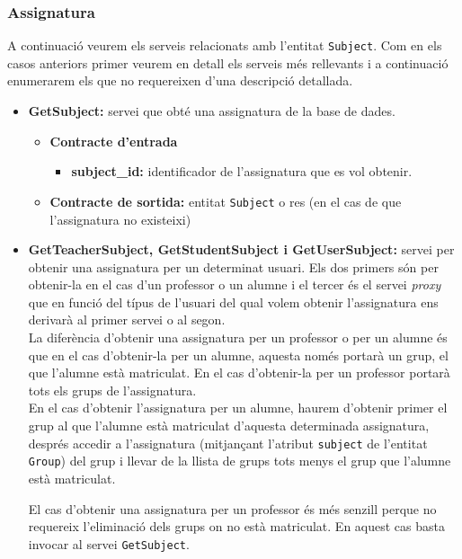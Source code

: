 		\subsubsection{Assignatura}
		
		A continuació veurem els serveis relacionats amb l'entitat \texttt{Subject}. Com en els casos anteriors primer veurem en detall els serveis més rellevants i a continuació enumerarem els que no requereixen d'una descripció detallada.
		
		\begin{itemize}
			\item \textbf{GetSubject:} servei que obté una assignatura de la base de dades.
				\begin{itemize}
					\item \textbf{Contracte d'entrada}
						\begin{itemize}
							\item \textbf{subject\_id:} identificador de l'assignatura que es vol obtenir.
						\end{itemize}
					\item \textbf{Contracte de sortida:} entitat \texttt{Subject} o res (en el cas de que l'assignatura no existeixi)
				\end{itemize}
				
			\item \textbf{GetTeacherSubject, GetStudentSubject i GetUserSubject:} servei per obtenir una assignatura per un determinat usuari. Els dos primers són per obtenir-la en el cas d'un professor o un alumne i el tercer és el servei \emph{proxy} que en funció del típus de l'usuari del qual volem obtenir l'assignatura ens derivarà al primer servei o al segon. \\
			
			La diferència d'obtenir una assignatura per un professor o per un alumne és que en el cas d'obtenir-la per un alumne, aquesta només portarà un grup, el que l'alumne està matriculat. En el cas d'obtenir-la per un professor portarà tots els grups de l'assignatura.\\
			
			En el cas d'obtenir l'assignatura per un alumne, haurem d'obtenir primer el grup al que l'alumne està matriculat d'aquesta determinada assignatura, després accedir a l'assignatura (mitjançant l'atribut \texttt{subject} de l'entitat \texttt{Group}) del grup i llevar de la llista de grups tots menys el grup que l'alumne està matriculat.
			
			El cas d'obtenir una assignatura per un professor és més senzill perque no requereix l'eliminació dels grups on no està matriculat. En aquest cas basta invocar al servei \texttt{GetSubject}.\\
			

\end{itemize}
